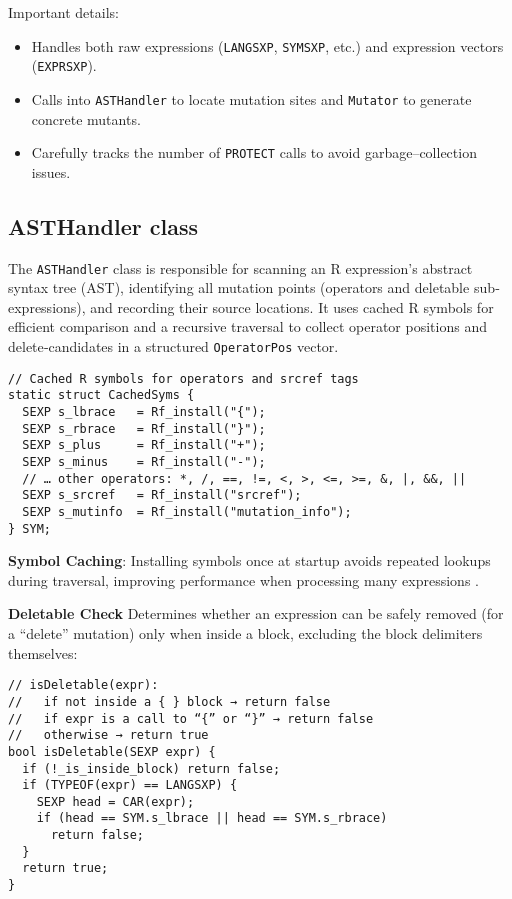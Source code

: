 Important details:
\begin{itemize}
  \item Handles both raw expressions (\texttt{LANGSXP}, \texttt{SYMSXP}, etc.) and expression vectors (\texttt{EXPRSXP}).
  \item Calls into \texttt{ASTHandler} to locate mutation sites and \texttt{Mutator} to generate concrete mutants.
  \item Carefully tracks the number of \texttt{PROTECT} calls to avoid garbage–collection issues.
\end{itemize}


\subsection{ASTHandler class}

The \texttt{ASTHandler} class is responsible for scanning an R expression’s abstract syntax tree (AST), identifying all mutation points (operators and deletable sub‐expressions), and recording their source locations.  It uses cached R symbols for efficient comparison and a recursive traversal to collect operator positions and delete‐candidates in a structured \texttt{OperatorPos} vector.

\begin{verbatim}
// Cached R symbols for operators and srcref tags
static struct CachedSyms {
  SEXP s_lbrace   = Rf_install("{");
  SEXP s_rbrace   = Rf_install("}");
  SEXP s_plus     = Rf_install("+");
  SEXP s_minus    = Rf_install("-");
  // … other operators: *, /, ==, !=, <, >, <=, >=, &, |, &&, ||
  SEXP s_srcref   = Rf_install("srcref");
  SEXP s_mutinfo  = Rf_install("mutation_info");
} SYM;
\end{verbatim}

\noindent\textbf{Symbol Caching}: Installing symbols once at startup avoids repeated lookups during traversal, improving performance when processing many expressions \cite{R-base}.

\medskip
\noindent\textbf{Deletable Check}  
Determines whether an expression can be safely removed (for a “delete” mutation) only when inside a block, excluding the block delimiters themselves:

\begin{verbatim}
// isDeletable(expr):
//   if not inside a { } block → return false
//   if expr is a call to “{” or “}” → return false
//   otherwise → return true
bool isDeletable(SEXP expr) {
  if (!_is_inside_block) return false;
  if (TYPEOF(expr) == LANGSXP) {
    SEXP head = CAR(expr);
    if (head == SYM.s_lbrace || head == SYM.s_rbrace)
      return false;
  }
  return true;
}
\end{verbatim}

